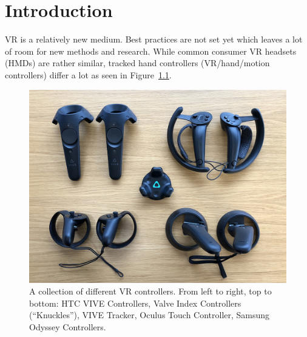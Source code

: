 \chapter{Introduction}\label{chapter:introduction}


\ac{VR} is a relatively new medium. Best practices are not set yet which leaves a lot of room for new methods and research. While common consumer \ac{VR} headsets (\acfp{HMD}) are rather similar, tracked hand controllers (\ac{VR}/hand/motion controllers) differ a lot as seen in Figure~\ref{fig:vr-controllers}.

\begin{figure}[H]
  \centering
  \includegraphics[width=12cm]{figures/vr_controllers.jpg}
  \caption[Collection of VR controllers]{A collection of different \ac{VR} controllers. From left to right, top to bottom: HTC VIVE Controllers, Valve Index Controllers (\enquote{Knuckles}), VIVE Tracker, Oculus Touch Controller, Samsung Odyssey Controllers.}\label{fig:vr-controllers}
\end{figure}




